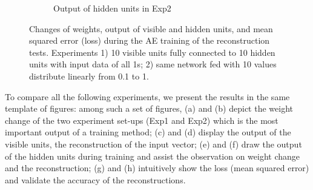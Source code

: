 \begin{figure}
\begin{subfigure}[t]{0.45\textwidth}
		\caption{Output of hidden units in Exp2}
	\end{subfigure}
	\caption{Changes of weights, output of visible and hidden units, and mean squared error (loss) during the AE training of the reconstruction tests. 
		Experiments 1) 10 visible units fully connected to 10 hidden units with input data of all 1s; 2) same network fed with 10 values distribute linearly from 0.1 to 1.}
	\label{fig:ae_orig}
\end{figure}

To compare all the following experiments, we present the results in the same template of figures:
among such a set of figures, (a) and (b) depict the weight change of the two experiment set-ups (Exp1 and Exp2) which is the most important output of a training method;
(c) and (d) display the output of the visible units, the reconstruction of the input vector;
(e) and (f) draw the output of the hidden units during training and assist the observation on weight change and the reconstruction;
(g) and (h) intuitively show the loss (mean squared error) and validate the accuracy of the reconstructions.


